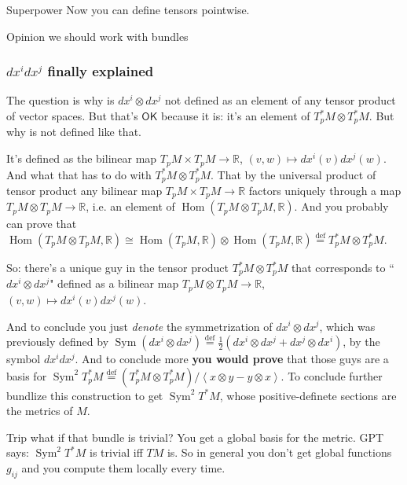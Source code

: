 \begin{thing8}{Superpower}\leavevmode
Now you can define tensors pointwise.
\end{thing8}

\begin{thing6}{Opinion}\leavevmode
we should work with bundles
\end{thing6}

\subsubsection{\(dx^idx^j\) finally explained}

The question is why is \(dx^i  \otimes dx^j\) not defined as an element of any tensor product of vector spaces. But that's  $\mathsf{OK}$ because it is: it's an element of \(T_p^*M\otimes T^*_pM\). But why is not defined like that.

It's defined as the bilinear map \(T_pM \times T_pM\to \mathbb{R}\), \((v,w)\mapsto dx^i(v)dx^j(w)\). And what that has to do with \(T_p ^*M\otimes T_p ^*M\). That by the universal product of tensor product any bilinear map \(T_pM \times T_pM\to \mathbb{R}\) factors uniquely through a map \(T_pM \otimes T_pM \to \mathbb{R}\), i.e. an element of \(\operatorname{Hom}(T_pM \otimes T_pM, \mathbb{R})\). And you probably can prove that \(\operatorname{Hom}(T_pM \otimes T_p M, \mathbb{R})\cong \operatorname{Hom}(T_pM,\mathbb{R})\otimes \operatorname{Hom}(T_pM, \mathbb{R})\overset{\operatorname{def}}{=}T_p ^*M \otimes T^*_pM\).

So: there's a unique guy in the tensor product \(T_p ^*M \otimes T^*_pM\) that corresponds to ``\(dx^i \otimes dx^j\)" defined as a bilinear map \(T_pM \otimes T_pM\to \mathbb{R}\), \((v,w)\mapsto dx^i(v)dx^j(w)\).

And to conclude you just \textit{denote} the symmetrization of \(dx^i \otimes dx^j\), which was previously defined by \(\operatorname{Sym}(dx^i \otimes dx^j)\overset{\operatorname{def}}{=}\frac{1}{2}(dx^i \otimes dx^j +dx^j \otimes dx^i)\), by the symbol \(dx^idx^j\). And to conclude more \textbf{you would prove} that those guys are a basis for \(\operatorname{Sym}^2T_p^*M\overset{\operatorname{def}}{=}(T_p^* M \otimes T_p^*M)/\left<x \otimes y-y \otimes x\right>\). To conclude further bundlize this construction to get \(\operatorname{Sym}^2T^*M\), whose positive-definete sections are the metrics of \(M\).

\begin{thing8}{Trip}\leavevmode
what if that bundle is trivial? You get a global basis for the metric. GPT says: \(\operatorname{Sym}^2T^*M\) is trivial iff \(TM\) is. So in general you don't get global functions \(g_{ij}\) and you compute them locally every time.
\end{thing8}

